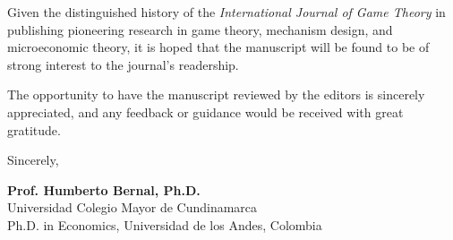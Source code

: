 \documentclass[12pt]{article}
\begin{document}
Given the distinguished history of the \textit{International Journal of Game Theory} in publishing pioneering research in game theory, mechanism design, and microeconomic theory, it is hoped that the manuscript will be found to be of strong interest to the journal's readership.

The opportunity to have the manuscript reviewed by the editors is sincerely appreciated, and any feedback or guidance would be received with great gratitude.

\vspace{2.5em}

\begin{flushleft}
Sincerely,

\vspace{2.5em}

\textbf{Prof. Humberto Bernal, Ph.D.} \\
Universidad Colegio Mayor de Cundinamarca \\
Ph.D. in Economics, Universidad de los Andes, Colombia
\end{flushleft}
\end{document}
